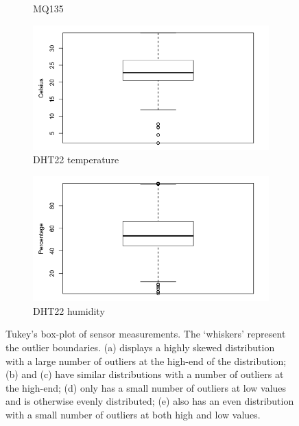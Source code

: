 \documentclass[11pt]{report}
\begin{document}
\begin{figure}[!htbp]
\begin{minipage}{1\linewidth}
\begin{subfigure}[t]{.5\linewidth}
                \caption{MQ135}
                \label{fig:pm_boxplot}
            \end{subfigure}
            \begin{subfigure}[t]{.5\linewidth}
            	\includegraphics[width=\textwidth]{images/temp_boxplot}
            	\caption{DHT22 temperature}
            	\label{fig:temp_boxplot}
	   \end{subfigure}
        \end{minipage}
    \begin{minipage}{1\linewidth}
    	\centering
        \begin{subfigure}[t]{.5\linewidth}
            \includegraphics[width=\textwidth]{images/humidity_boxplot}
            \caption{DHT22 humidity}
            \label{fig:humidity_boxplot}
        \end{subfigure}
    \end{minipage}
    \caption[Tukey's boxplots.]{Tukey's box-plot of sensor measurements. The `whiskers' represent the outlier boundaries. (a) displays a highly skewed distribution with a large number of outliers at the high-end of the distribution; (b) and (c) have similar distributions with a number of outliers at the high-end; (d) only has a small number of outliers at low values and is otherwise evenly distributed; (e) also has an even distribution with a small number of outliers at both high and low values.}
    \label{tukey_boxplots}
\end{figure}
\end{document}
